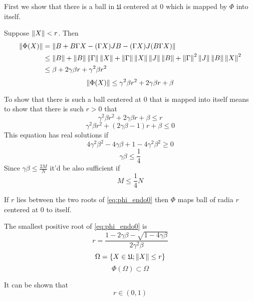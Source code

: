 \documentclass{article}
\begin{document}
First we show that there is a ball in $\mathfrak U$ centered at $0$
which is mapped by $\Phi$ into itself.

Suppose $\left\|{X}\right\| < r$.
Then
    \begin{align*}
        \left\|{\Phi(X)}\right\| &=    \left\|{B + B\Gamma X - (\Gamma X) JB - (\Gamma X)J(B\Gamma X)}\right\| \\
                     &\leq \left\|{B}\right\| + \left\|{B}\right\|\left\|{\Gamma}\right\| \left\|{X}\right\| + \left\|{\Gamma}\right\|\left\|{X}\right\|\left\|{J}\right\|\left\|{B}\right\| + \left\|{\Gamma}\right\|^2\left\|{J}\right\|\left\|{B}\right\|\left\|{X}\right\|^2 \\
                     &\leq \beta + 2\gamma\beta r + \gamma^2\beta r^2
    \end{align*}
    \begin{equation}
        \label{eq:phi_norm_b1}
        \left\|{\Phi(X)}\right\| \leq \gamma^2\beta r^2 + 2\gamma\beta r + \beta
    \end{equation}

To show that there is such a ball centered at $0$ that is mapped into itself
means to show that there is such $r>0$ that
$$\gamma^2\beta r^2 + 2\gamma\beta r + \beta \leq r$$
\begin{equation}\label{eq:phi_endo0}
    \gamma^2\beta r^2 + (2\gamma\beta - 1) r + \beta \leq 0
\end{equation}
This equation has real solutions if
$$4\gamma^2\beta^2 - 4\gamma\beta + 1 - 4\gamma^2\beta^2 \geq 0$$
\begin{equation}\label{eq:phi_endo1}
    \gamma\beta\leq\frac14
\end{equation}
Since $\gamma\beta\leq\frac{2M}{N}$ it'd be also sufficient if
\begin{equation}\label{eq:phi_endo2}
    M \leq \frac14 N
\end{equation}

\begin{propose}
    If $r$ lies between the two roots of \eqref{eq:phi_endo0}
    then $\Phi$ maps ball of radia $r$ centered at $0$ to itself.

    The smallest positive root of \eqref{eq:phi_endo0} is
    \begin{equation}\label{eq:endo_r0}
        r = \frac{1 - 2\gamma\beta - \sqrt{1-4\gamma\beta}}{2 \gamma^2 \beta}
    \end{equation}
    $$\Omega = \{X\in\mathfrak U; \left\|{X}\right\| \leq r \}$$
    $$\Phi(\Omega)\subset\Omega$$

    It can be shown that
    $$r\in (0,1)$$
\end{propose}
\end{document}
